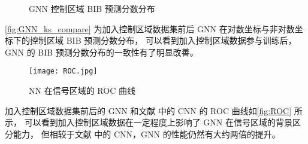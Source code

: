 \begin{figure}[ht]
    \centering
    \hfill
    \caption{GNN 控制区域 BIB 预测分数分布}
    \label{fig:GNN_ks_compare}
\end{figure}

\autoref{fig:GNN_ks_compare} 为加入控制区域数据集前后 GNN 在对数坐标与非对数坐标下的控制区域 BIB 预测分数分布，
可以看到加入控制区域数据参与训练后，GNN 的 BIB 预测分数分布的一致性有了明显改善。

\begin{figure}[ht]
    \centering
    \texttt{[image: ROC.jpg]}
    \caption{NN 在信号区域的 ROC 曲线}
    \label{fig:ROC}
\end{figure}

加入控制区域数据集前后的 GNN 和文献\cite{ATLAS:2022zhj} 中的 CNN 的 ROC 曲线如\autoref{fig:ROC} 所示，
可以看到加入控制区域数据在一定程度上影响了 GNN 在信号区域的背景区分能力，
但相较于文献\cite{ATLAS:2022zhj} 中的 CNN，GNN 的性能仍然有大约两倍的提升。

